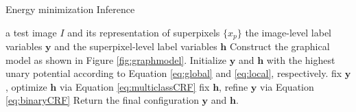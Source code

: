 \renewcommand{\algorithmicrequire}{\textbf{Input:}}  %
\renewcommand{\algorithmicensure}{\textbf{Output:}} %

\begin{algorithm}
\caption{Energy minimization Inference}
\label{alg:energy}
\begin{algorithmic}[1]
    \Require
    a test image $I$ and its representation of superpixels $\{x_p\}$
    \Ensure
    the image-level label variables $\boldsymbol{y}$ and the superpixel-level label variables $\boldsymbol{h}$
    \State Construct the graphical model as shown in Figure \ref{fig:graphmodel}.
    \State Initialize $\boldsymbol{y}$ and $\boldsymbol{h}$ with the highest unary potential according to Equation \eqref{eq:global} and \eqref{eq:local}, respectively.
        \State fix $\boldsymbol{y}$, optimize $\boldsymbol{h}$ via Equation \eqref{eq:multiclassCRF}
        \State fix $\boldsymbol{h}$, refine $\boldsymbol{y}$ via Equation \eqref{eq:binaryCRF}
    \EndFor
    \State Return the final configuration $\boldsymbol{y}$ and $\boldsymbol{h}$.
\end{algorithmic}
\end{algorithm}
